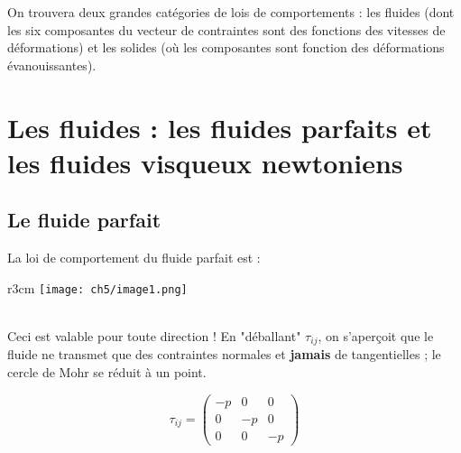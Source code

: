 On trouvera deux grandes catégories de lois de comportements : les fluides (dont les six composantes 
du vecteur de contraintes sont des fonctions des vitesses de déformations) et les solides (où 
les composantes sont fonction des déformations évanouissantes).

\section{Les fluides : les fluides parfaits et les fluides visqueux newtoniens}
    \subsection{Le fluide parfait}
    La loi de comportement du fluide parfait est : \\
    \begin{wrapfigure}[2]{r}{3cm}
        \texttt{[image: ch5/image1.png]}
        \end{wrapfigure}
        
    \ \\
    
    Ceci est valable pour toute direction ! En "déballant" $\tau_{ij}$, on s'aperçoit que le
    fluide ne transmet que des contraintes normales et \textbf{jamais} de tangentielles ; le
    cercle de Mohr se réduit à un point.
    
    \begin{equation}
    \tau_{ij} =
    \begin{pmatrix}
    -p &   0 &  0 \\
     0  & -p &  0 \\
     0  &  0 & -p
    \end{pmatrix}
    \end{equation}

